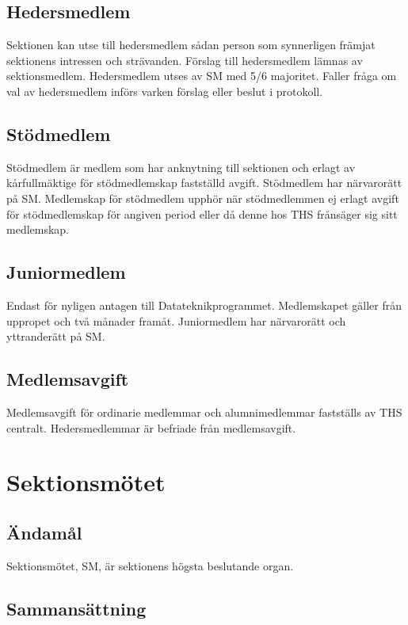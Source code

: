\documentclass{dgovdoc}
\begin{document}
\subsection{Hedersmedlem}
\label{sec:hedersmedlem}

Sektionen kan utse till hedersmedlem sådan person som synnerligen främjat
sektionens intressen och strävanden. Förslag till hedersmedlem lämnas av
sektionsmedlem. Hedersmedlem utses av SM med 5/6 majoritet. Faller fråga om val
av hedersmedlem införs varken förslag eller beslut i protokoll.

\subsection{Stödmedlem}
\label{sec:stodmedlem}

Stödmedlem är medlem som har anknytning till sektionen och erlagt av
kårfullmäktige för stödmedlemskap fastställd avgift. Stödmedlem har närvarorätt
på SM. Medlemskap för stödmedlem upphör när stödmedlemmen ej erlagt avgift för
stödmedlemskap för angiven period eller då denne hos THS frånsäger sig sitt
medlemskap.

\subsection{Juniormedlem}
\label{sec:juniormedlem}

Endast för nyligen antagen till Datateknikprogrammet. Medlemskapet gäller från
uppropet och två månader framåt. Juniormedlem har närvarorätt och yttranderätt
på SM.

\subsection{Medlemsavgift}

Medlemsavgift för ordinarie medlemmar och alumnimedlemmar fastställs av THS
centralt. Hedersmedlemmar är befriade från medlemsavgift.

\section{Sektionsmötet}

\subsection{Ändamål}

Sektionsmötet, SM, är sektionens högsta beslutande organ.

\subsection{Sammansättning}
\end{document}
